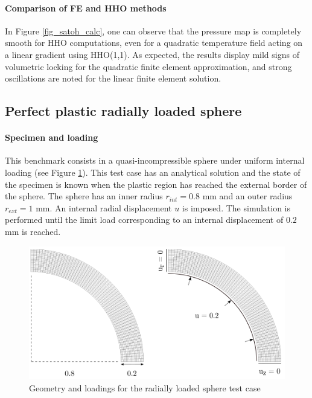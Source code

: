 \paragraph{Comparison of FE and HHO methods}

In Figure \ref{fig_satoh_calc}, one can observe that the pressure map is completely smooth for HHO computations, even for a quadratic temperature field acting on a linear gradient using HHO(1,1). As expected, the results display mild signs of volumetric locking for the quadratic finite element
approximation, and strong oscillations are noted for the linear finite element solution.

\subsection{Perfect plastic radially loaded sphere}
\label{sec_swelling_sphere}

\paragraph{Specimen and loading}

This benchmark consists in a quasi-incompressible sphere under uniform internal loading (see Figure \ref{fig_sphere_mesh}).
This test case has an analytical solution and the state of the specimen is known when the plastic region has reached the external border of the sphere.
The sphere has an inner radius $r_{int} = 0.8$ mm and an outer
radius $r_{ext} = 1$ mm. An internal radial displacement $u$ is imposed.
The simulation is performed until the limit load corresponding to an internal displacement of $0.2$ mm is reached.

\begin{figure}[H]
    \centering
    \includegraphics[width=12.cm]{../chapter_002_hho_mechanics/drawings/sphere_mesh.png}
    \caption{Geometry and loadings for the radially loaded sphere test case}
    \label{fig_sphere_mesh}
\end{figure}

